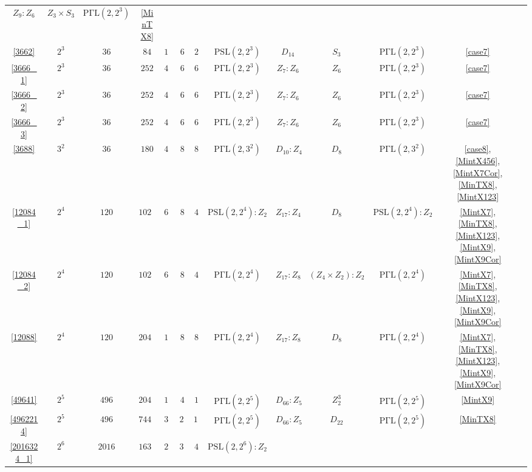 \documentclass[a4paper,twopage,reqno,12pt]{amsart}
\theoremstyle{definition}
\numberwithin{equation}{section}
\newcommand{\PSL}{\mathrm{PSL}}
\newcommand{\PGaL}{\mathrm{P\Gamma L}}
\begin{document}
\begin{table}
{\begin{tabular}{ccccccccccccc}
			$Z_{9} : Z_{6}$          & $Z_{3} \times S_{3}$        & $\PGaL(2,2^{3}) $     & \ref{MinTX8} \\
 \ref{3662}& $2 ^3$ & $36$  & $84$   & $14$  & $6$  & $2$       & $\PSL(2,2^{3})$       & 
			$D_{14}$              & $S_{3}$             & $\PGaL(2,2^{3}) $     & \ref{case7} \\
 \ref{3666_1} & $2 ^3$ & $36$  & $252$  & $42$  & $6$  & $6$       & $\PGaL(2,2^{3}) $  & 
			$Z_{7} : Z_{6}$          & $Z_{6}$             & $\PGaL(2,2^{3}) $     & \ref{case7}\\
 \ref{3666_2}& $2 ^3$ & $36$  & $252$  & $42$  & $6$  & $6$       & $\PGaL(2,2^{3}) $  & 
			$Z_{7} : Z_{6}$          & $Z_{6}$             & $\PGaL(2,2^{3}) $     & \ref{case7} \\
 \ref{3666_3}& $2 ^3$ & $36$  & $252$  & $42$  & $6$  & $6$       & $\PGaL(2,2^{3}) $  &
			$Z_{7} : Z_{6}$          & $Z_{6}$             & $\PGaL(2,2^{3}) $     & \ref{case7} \\
 \ref{3688}& $3 ^2$ & $36$  & $180$  & $40$  & $8$  & $8$       & $\PGaL(2,3^{2}) $ &
			$D_{10} : Z_{4}$   & $D_{8}$             & $\PGaL(2,3^{2}) $    & \ref{case8}, \ref{MintX456}, \ref{MintX7Cor}, \ref{MinTX8}, \ref{MintX123} \\ 
\ref{12084_1}& $2 ^4$ & $120$ & $1020$ & $68$  & $8$  & $4$       & $\PSL(2,2^{4}):Z_2 $ &
			$Z_{17} : Z_{4}$         & $D_{8}$             & $\PSL(2,2^{4}):Z_2 $    & \ref{MintX7}, \ref{MinTX8}, \ref{MintX123}, \ref{MintX9}, \ref{MintX9Cor} \\
 \ref{12084_2}& $2 ^4$ & $120$ & $1020$ & $68$  & $8$  & $4$       & $\PGaL(2,2^{4}) $ &
			$Z_{17} : Z_{8}$         & $(Z_{4} \times Z_{2}) : Z_{2}$ & $\PGaL(2,2^{4}) $    & \ref{MintX7}, \ref{MinTX8}, \ref{MintX123}, \ref{MintX9}, \ref{MintX9Cor} \\
 \ref{12088}& $2 ^4$ & $120$ & $2040$ & $136$ & $8$  & $8$       & $\PGaL(2,2^{4}) $ & 
			$Z_{17} : Z_{8}$         & $D_{8}$             & $\PGaL(2,2^{4}) $    & \ref{MintX7}, \ref{MinTX8}, \ref{MintX123}, \ref{MintX9}, \ref{MintX9Cor} \\
 \ref{49641}& $2^5$& $496$& $20460$& $165$ & $4$ & $1$ & $\PGaL(2,2^5)$ & $D_{66}:Z_{5}$ & $Z_{2}^3$ & $\PGaL(2,2^5)$ & \ref{MintX9} \\
 \ref{4962214}& $2 ^5$ & $496$ & $7440$ & $330$ & $22$ & $14$      & $\PGaL(2,2^{5})$ & 
			$D_{66}:Z_{5}$ & $D_{22}$            & $\PGaL(2,2^{5})$    & \ref{MinTX8} \\
\ref{2016324_1}& $2 ^6$ & $2016$ & $16380$ & $260$ & $32$ & $4$      & $\PSL(2,2^{6}):Z_{2}$ & 

\end{tabular}}
\end{table}
\end{document}
